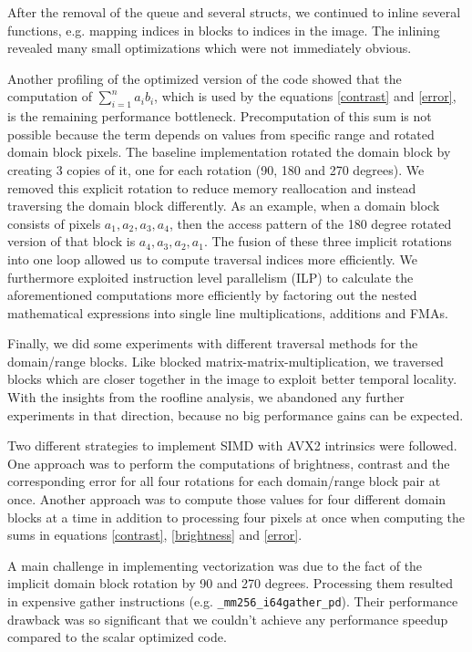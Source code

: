 After the removal of the queue and several structs, we continued to inline several functions, e.g. mapping indices in blocks
to indices in the image. The inlining revealed many small optimizations which were not immediately obvious.

Another profiling of the optimized version of the code showed that the computation of $\sum_{i=1}^n a_i b_i$, which is used by the equations
\ref{contrast} and \ref{error}, is the remaining performance bottleneck. Precomputation of this sum is not possible
because the term depends on values from specific range and rotated domain block pixels. The baseline implementation rotated
the domain block by creating 3 copies of it, one for each rotation (90, 180 and 270 degrees). We removed this explicit rotation
to reduce memory reallocation and instead traversing the domain block differently. As an example, when a domain block consists
of pixels $a_1, a_2, a_3, a_4$, then the access pattern of the 180 degree rotated version of that block is $a_4, a_3, a_2, a_1$.
The fusion of these three implicit rotations into one loop allowed us to compute traversal indices more efficiently.
We furthermore exploited instruction level parallelism (ILP) to calculate the aforementioned computations more efficiently
by factoring out the nested mathematical expressions into single line multiplications, additions and FMAs.

Finally, we did some experiments with different traversal methods for the domain/range blocks. Like blocked matrix-matrix-multiplication,
we traversed blocks which are closer together in the image to exploit better temporal locality.
With the insights from the roofline analysis, we abandoned any further experiments in that direction, because no big performance
gains can be expected.

 Two different strategies to implement SIMD with AVX2 intrinsics 
were followed. One approach was to perform the computations of brightness,
contrast and the corresponding error for all four rotations for each
domain/range block pair at once. Another approach was to compute 
those values for four different domain blocks at a time in
addition to processing four pixels at once when computing the sums in equations
\ref{contrast}, \ref{brightness} and \ref{error}.

A main challenge in implementing vectorization was due to the fact of the implicit
domain block rotation by 90 and 270 degrees. Processing them resulted in expensive
gather instructions (e.g. \verb|_mm256_i64gather_pd|). Their performance drawback was
so significant that we couldn't achieve any performance speedup compared to the scalar
optimized code.

